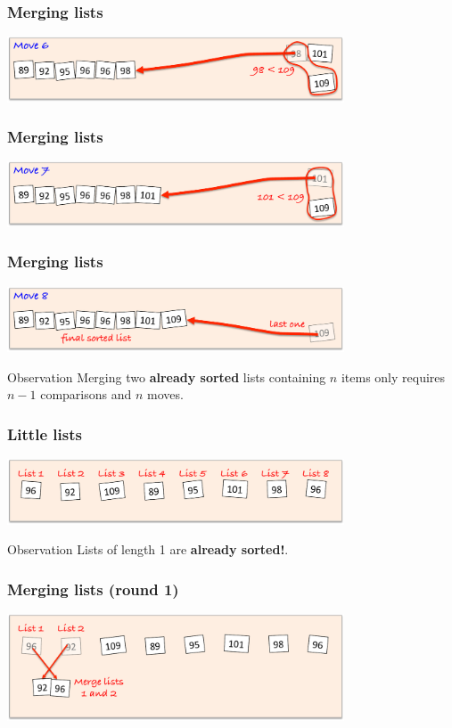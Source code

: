 \documentclass{beamer} %
\newcommand\emc[1]{\textcolor{midred}{\textbf{#1}}}
\begin{document}
\begin{frame}
  \frametitle{Merging lists}
  \centering
  \includegraphics[width=100mm]{assets/merge-move6-crop.pdf}
\end{frame}

\begin{frame}
  \frametitle{Merging lists}
  \centering
  \includegraphics[width=100mm]{assets/merge-move7-crop.pdf}
\end{frame}

\begin{frame}
  \frametitle{Merging lists}
  \centering
  \includegraphics[width=100mm]{assets/merge-move8-crop.pdf}

  \begin{block}{Observation}
    Merging two \emc{already sorted} lists containing $n$ items only requires $n-1$ comparisons and $n$ moves.
    \end{block}
\end{frame}

\begin{frame}
  \frametitle{Little lists}
  \centering
  \includegraphics[width=100mm]{assets/merge-move9-crop.pdf}
  \begin{block}{Observation}
    Lists of length 1 are \emc{already sorted!}.
    \end{block}
\end{frame}

\begin{frame}
  \frametitle{Merging lists (round 1)}
  \centering
  \includegraphics[width=100mm]{assets/merge-move10-crop.pdf}
\end{frame}
\end{document}
